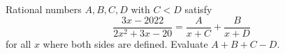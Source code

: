Rational numbers $A,B,C,D$ with $C<D$ satisfy
\[\dfrac{3x-2022}{2x^2+3x-20}=\dfrac A{x+C}+\dfrac B{x+D}\]
for all $x$ where both sides are defined. Evaluate $A+B+C-D$.
